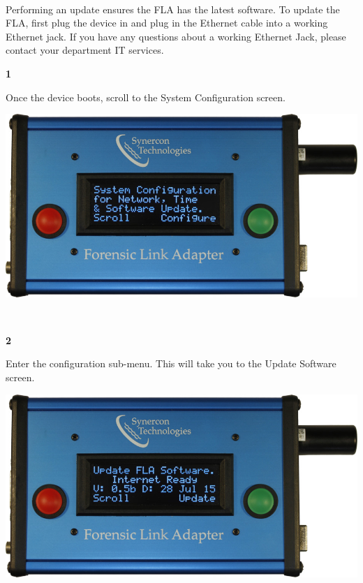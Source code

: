 \documentclass[11pt, oneside]{book}
\begin{document}
\paragraph{  }
Performing an update ensures the FLA has the latest software. To update the FLA, first plug the device in and plug in the Ethernet cable into a working Ethernet jack. If you have any questions about a working Ethernet Jack, please contact your department IT services.
\\[\baselineskip]
\noindent\begin{minipage}{0.45\textwidth}%
\begin{center}
\textbf{1}\\[\baselineskip]
\end{center}
Once the device boots, scroll to the System Configuration screen.
\end{minipage}%
\hfill%
\begin{minipage}{0.45\textwidth}
\includegraphics[width=\linewidth]{../media/fla_screens/ethernet_and_others/main/sys_conf}
\end{minipage}
\\[\baselineskip]
\noindent\begin{minipage}{0.45\textwidth}%
\begin{center}
\textbf{2}\\[\baselineskip]
\end{center}
Enter the configuration sub-menu. This will take you to the Update Software screen.
\end{minipage}%
\hfill%
\begin{minipage}{0.45\textwidth}
\includegraphics[width=\linewidth]{../media/fla_screens/ethernet_and_others/sys_conf/update_software}
\end{minipage}
\end{document}
